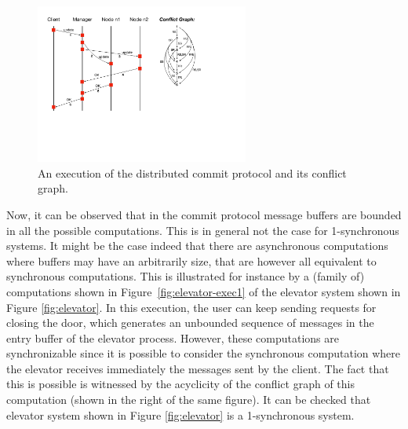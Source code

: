 \begin{figure}[h]
\includegraphics[width=7cm]{MSC-commit.pdf}
\caption{An execution of the distributed commit protocol and its conflict graph.}
\label{fig:commit-exec}
\end{figure}

Now, it can be observed that in the commit protocol message buffers are bounded in all the possible computations. This is in general not the case for 1-synchronous systems. It might be the case indeed that there are asynchronous computations where buffers may have an arbitrarily size, that are however all equivalent to synchronous computations. This is illustrated for instance by a (family of) computations shown in Figure~\ref{fig:elevator-exec1} of the elevator system shown in Figure \ref{fig:elevator}.  In this execution, the user can keep sending requests for closing the door, which generates an unbounded sequence of messages in the entry buffer of the elevator process. However, these computations are synchronizable since it is possible to consider the synchronous computation where the elevator receives immediately the messages sent by the client. The fact that this is possible is witnessed by the acyclicity of the conflict graph of this computation (shown in the right of the same figure). It can be checked that elevator system shown in Figure \ref{fig:elevator} is a 1-synchronous system. 

